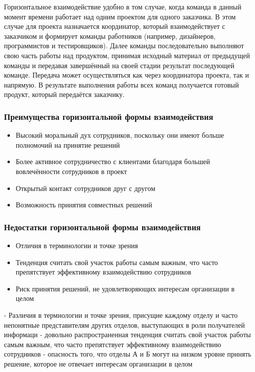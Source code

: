 \documentclass{../industrial-development}
\begin{document}
\lecturenotes 
Горизонтальное взаимодействие удобно в том случае, когда команда в данный момент времени работает над одним проектом для одного заказчика. В этом случае для проекта назначается координатор, который взаимодействует с заказчиком и формирует команды работников (например, дизайнеров, программистов и тестировщиков). Далее команды последовательно выполняют свою часть работы над продуктом, принимая исходный материал от предыдущей команды и передавая завершённый на своей стадии результат последующей команде. Передача может осуществляться как через координатора проекта, так и напрямую. В результате выполнения работы всех команд получается готовый продукт, который передаётся заказчику.

\begin{frame} \frametitle{Преимущества горизонтальной формы взаимодействия}
  
  \begin{itemize}
  \item Высокий моральный дух сотрудников, поскольку они имеют больше полномочий на принятие решений
  \item Более активное сотрудничество с клиентами благодаря большей вовлечённости сотрудников в проект
  \item Открытый контакт сотрудников друг с другом
  \item Возможность принятия совместных решений
  \end{itemize}
\end{frame}

\begin{frame} \frametitle{Недостатки горизонтальной формы взаимодействия}
	
	\begin{itemize}
		\item Отличия в терминологии и точке зрения
		\item Тенденция считать свой участок работы самым важ­ным, что часто препятствует эффективному взаимодей­ствию сотрудников
		\item Риск принятия решений, не удовлетворяющих интересам организации в целом
	\end{itemize}
\end{frame}

\lecturenotes
- Различия в термнологии и точке зрения, присущие каждому отде­лу и часто непонятные представителям других отделов, вы­ступающих в роли получателей информаци
- довольно распространен­ная тенденция считать свой участок работы самым важ­ным, что часто препятствует эффективному взаимодей­ствию сотрудников
- опасность того, что отделы А и Б могут на низком уровне принять решение, которое не отвечает интересам организации в целом
\end{document}
